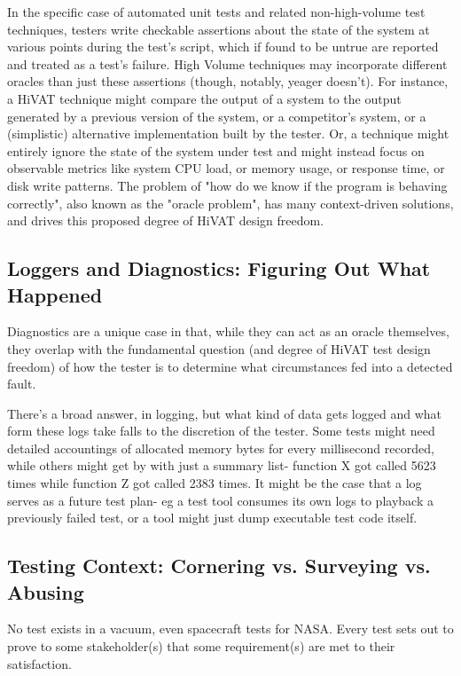 In the specific case of automated unit tests and related non-high-volume test techniques, testers write checkable assertions about the state of the system at various points during the test's script, which if found to be untrue are reported and treated as a test's failure. High Volume techniques may incorporate different oracles than just these assertions (though, notably, yeager doesn't). For instance, a HiVAT technique might compare the output of a system to the output generated by a previous version of the system, or a competitor's system, or a (simplistic) alternative implementation built by the tester. Or, a technique might entirely ignore the state of the system under test and might instead focus on observable metrics like system CPU load, or memory usage, or response time, or disk write patterns. The problem of "how do we know if the program is behaving correctly", also known as the "oracle problem", has many context-driven solutions, and drives this proposed degree of HiVAT design freedom.

\subsection{Loggers and Diagnostics: Figuring Out What Happened}
Diagnostics are a unique case in that, while they can act as an oracle themselves, they overlap with the fundamental question (and degree of HiVAT test design freedom) of how the tester is to determine what circumstances fed into a detected fault.

There's a broad answer, in logging, but what kind of data gets logged and what form these logs take falls to the discretion of the tester. Some tests might need detailed accountings of allocated memory bytes for every millisecond recorded, while others might get by with just a summary list- function X got called 5623 times while function Z got called 2383 times. It might be the case that a log serves as a future test plan- eg a test tool consumes its own logs to playback a previously failed test, or a tool might just dump executable test code itself.

\subsection{Testing Context: Cornering vs. Surveying vs. Abusing}
No test exists in a vacuum, even spacecraft tests for NASA. Every test sets out to prove to some stakeholder(s) that some requirement(s) are met to their satisfaction.

